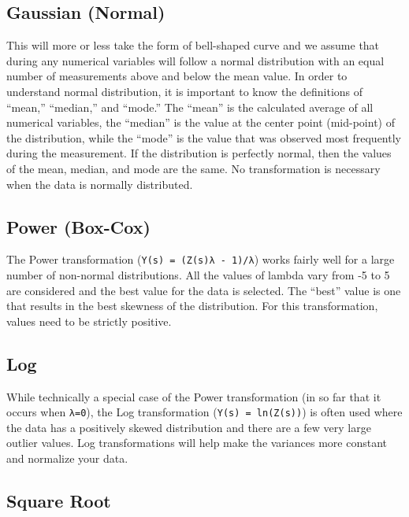 \documentclass[
]{book}
\begin{document}
\hypertarget{gaussian-normal}{%
\subsection*{Gaussian (Normal)}\label{gaussian-normal}}


This will more or less take the form of bell-shaped curve and we assume that during any numerical variables will follow a normal distribution with an equal number of measurements above and below the mean value. In order to understand normal distribution, it is important to know the definitions of ``mean,'' ``median,'' and ``mode.'' The ``mean'' is the calculated average of all numerical variables, the ``median'' is the value at the center point (mid-point) of the distribution, while the ``mode'' is the value that was observed most frequently during the measurement. If the distribution is perfectly normal, then the values of the mean, median, and mode are the same. No transformation is necessary when the data is normally distributed.

\hypertarget{power-box-cox}{%
\subsection*{Power (Box-Cox)}\label{power-box-cox}}


The Power transformation (\texttt{Y(s)\ =\ (Z(s)λ\ -\ 1)/λ}) works fairly well for a large number of non-normal distributions. All the values of lambda vary from -5 to 5 are considered and the best value for the data is selected. The ``best'' value is one that results in the best skewness of the distribution. For this transformation, values need to be strictly positive.

\hypertarget{log}{%
\subsection*{Log}\label{log}}


While technically a special case of the Power transformation (in so far that it occurs when \texttt{λ=0}), the Log transformation (\texttt{Y(s)\ =\ ln(Z(s))}) is often used where the data has a positively skewed distribution and there are a few very large outlier values. Log transformations will help make the variances more constant and normalize your data.

\hypertarget{square-root}{%
\subsection*{Square Root}\label{square-root}}
\end{document}
